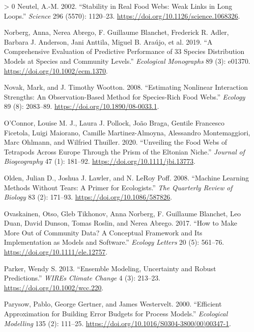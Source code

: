 \documentclass[11pt]{article}
\newlength{\cslhangindent}
\newenvironment{CSLReferences}[3] %
 {%
  \setlength{\parindent}{0pt}
  \ifodd #1 \everypar{\setlength{\hangindent}{\cslhangindent}}\ignorespaces\fi
  \ifnum #2 > 0
  \setlength{\parskip}{#2\baselineskip}
  \fi
 }%
 {}
\begin{document}
\begin{CSLReferences}{1}{0}
\leavevmode\hypertarget{ref-Neutel2002StaRea}{}%
Neutel, A.-M. 2002. {``Stability in Real Food Webs: Weak Links in Long
Loops.''} \emph{Science} 296 (5570): 1120--23.
\url{https://doi.org/10.1126/science.1068326}.

\leavevmode\hypertarget{ref-Norberg2019ComEva}{}%
Norberg, Anna, Nerea Abrego, F. Guillaume Blanchet, Frederick R. Adler,
Barbara J. Anderson, Jani Anttila, Miguel B. Araújo, et al. 2019. {``A
Comprehensive Evaluation of Predictive Performance of 33 Species
Distribution Models at Species and Community Levels.''} \emph{Ecological
Monographs} 89 (3): e01370. \url{https://doi.org/10.1002/ecm.1370}.

\leavevmode\hypertarget{ref-Novak2008EstNon}{}%
Novak, Mark, and J. Timothy Wootton. 2008. {``Estimating Nonlinear
Interaction Strengths: An Observation-Based Method for Species-Rich Food
Webs.''} \emph{Ecology} 89 (8): 2083--89.
\url{https://doi.org/10.1890/08-0033.1}.

\leavevmode\hypertarget{ref-OConnor2020UnvFoo}{}%
O'Connor, Louise M. J., Laura J. Pollock, João Braga, Gentile Francesco
Ficetola, Luigi Maiorano, Camille Martinez-Almoyna, Alessandro
Montemaggiori, Marc Ohlmann, and Wilfried Thuiller. 2020. {``Unveiling
the Food Webs of Tetrapods Across Europe Through the Prism of the
Eltonian Niche.''} \emph{Journal of Biogeography} 47 (1): 181--92.
\url{https://doi.org/10.1111/jbi.13773}.

\leavevmode\hypertarget{ref-Olden2008MacLea}{}%
Olden, Julian D., Joshua J. Lawler, and N. LeRoy Poff. 2008. {``Machine
Learning Methods Without Tears: A Primer for Ecologists.''} \emph{The
Quarterly Review of Biology} 83 (2): 171--93.
\url{https://doi.org/10.1086/587826}.

\leavevmode\hypertarget{ref-Ovaskainen2017HowMak}{}%
Ovaskainen, Otso, Gleb Tikhonov, Anna Norberg, F. Guillaume Blanchet,
Leo Duan, David Dunson, Tomas Roslin, and Nerea Abrego. 2017. {``How to
Make More Out of Community Data? A Conceptual Framework and Its
Implementation as Models and Software.''} \emph{Ecology Letters} 20 (5):
561--76. \url{https://doi.org/10.1111/ele.12757}.

\leavevmode\hypertarget{ref-Parker2013EnsMod}{}%
Parker, Wendy S. 2013. {``Ensemble Modeling, Uncertainty and Robust
Predictions.''} \emph{WIREs Climate Change} 4 (3): 213--23.
\url{https://doi.org/10.1002/wcc.220}.

\leavevmode\hypertarget{ref-Parysow2000EffApp}{}%
Parysow, Pablo, George Gertner, and James Westervelt. 2000. {``Efficient
Approximation for Building Error Budgets for Process Models.''}
\emph{Ecological Modelling} 135 (2): 111--25.
\url{https://doi.org/10.1016/S0304-3800(00)00347-1}.


\end{CSLReferences}
\end{document}
